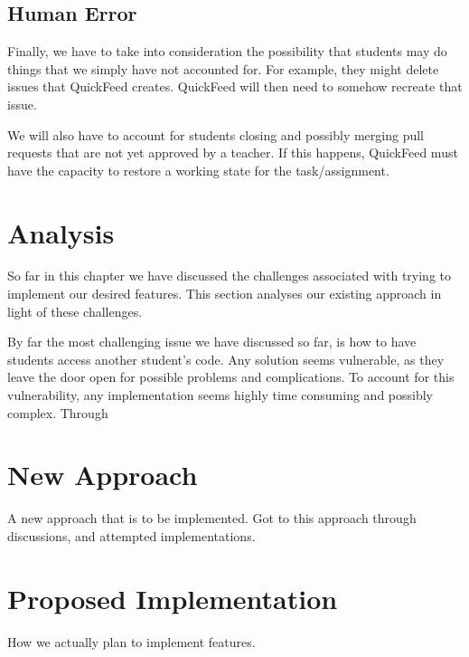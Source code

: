 
\subsection{Human Error}

Finally, we have to take into consideration the possibility that students may do things that we simply have not accounted for.
For example, they might delete issues that QuickFeed creates.
QuickFeed will then need to somehow recreate that issue.

We will also have to account for students closing and possibly merging pull requests that are not yet approved by a teacher.
If this happens, QuickFeed must have the capacity to restore a working state for the task/assignment.

\section{Analysis}

So far in this chapter we have discussed the challenges associated with trying to implement our desired features.
This section analyses our existing approach in light of these challenges.

By far the most challenging issue we have discussed so far, is how to have students access another student's code.
Any solution seems vulnerable, as they leave the door open for possible problems and complications.
To account for this vulnerability, any implementation seems highly time consuming and possibly complex.
Through 

\section{New Approach}

A new approach that is to be implemented. Got to this approach through discussions, and attempted implementations.

\section{Proposed Implementation}

How we actually plan to implement features.
